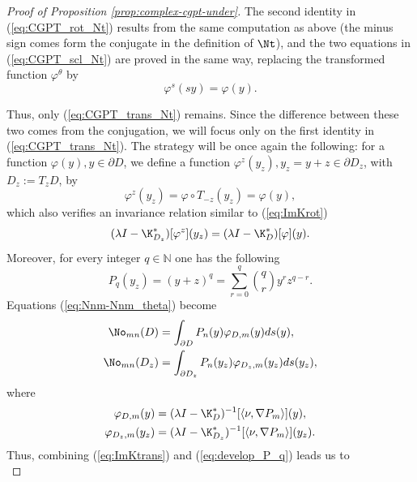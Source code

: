 \begin{proof}[Proof of Proposition \ref{prop:complex-cgpt-under}]
The second identity in (\ref{eq:CGPT_rot_Nt}) results from the
same computation as above (the minus sign comes form the conjugate
in the definition of $\Nt$), and the two equations in
(\ref{eq:CGPT_scl_Nt}) are proved in the same way, replacing the
transformed function $\varphi^\theta$ by
\begin{equation*}
\varphi^s(sy)=\varphi(y).
\end{equation*}

Thus, only (\ref{eq:CGPT_trans_Nt}) remains. Since the difference
between these two comes from the conjugation, we will focus only
on the first identity in (\ref{eq:CGPT_trans_Nt}). The strategy
will be once again the following: for a function $\varphi(y), y
\in
\partial D$, we define a function $\varphi^z(y_z), y_z =y + z \in
\partial D_z$, with $D_z:=T_z D$,  by
\begin{equation*}
\varphi^z(y_z)=\varphi \circ T_{-z}(y_z)=\varphi(y),
\end{equation*}
which also verifies an invariance relation similar to
(\ref{eq:ImKrot})
\begin{equation}
(\lambda I - \K^*_{D_z})[\varphi^z](y_z) = (\lambda I - \K^*_{D})
[\varphi] (y). \label{eq:ImKtrans}
\end{equation}
Moreover, for every integer $q\in\mathbb{N}$ one has the following
\begin{equation}
P_q(y_z) = (y+z)^q = \sum_{r=0}^q  \binom {q} {r} y^r z^{q-r}.
\label{eq:develop_P_q}
\end{equation}
Equations (\ref{eq:Nnm-Nnm_theta}) become
\begin{equation*}
\begin{aligned}
\No_{mn}(D) &= \int_{\partial D} P_n(y) \varphi_{D,m}(y) ds(y),\\
\No_{mn}(D_z) &= \int_{\partial D_z} P_n(y_z) \varphi_{D_z,m}(y_z) ds(y_z),\\
\end{aligned}
\end{equation*}
where
\begin{equation*}
\begin{aligned}
\varphi_{D,m}(y) &= (\lambda I - \K^*_{D})^{-1}[\langle \nu, \nabla P_m\rangle](y), \\
\varphi_{D_z,m}(y_z) &= (\lambda I - \K^*_{D_z})^{-1}[\langle \nu,
\nabla P_m \rangle](y_z).
\end{aligned}
\end{equation*}
Thus, combining (\ref{eq:ImKtrans}) and (\ref{eq:develop_P_q})
leads us to
\begin{equation*}

\end{equation*}
\end{proof}
